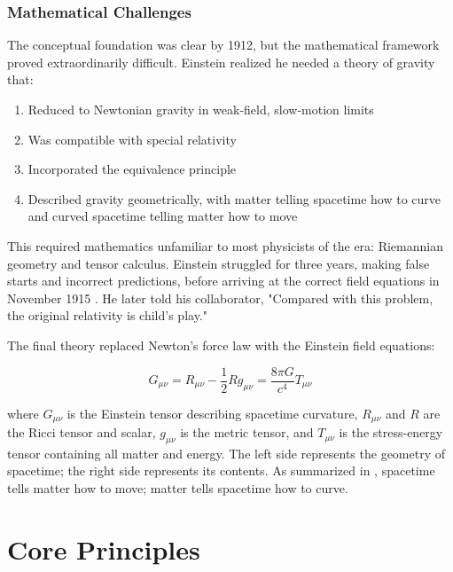 \documentclass[12pt, a4paper]{article}
\begin{document}
	\subsubsection{Mathematical Challenges}
	
	The conceptual foundation was clear by 1912, but the mathematical framework proved extraordinarily difficult. Einstein realized he needed a theory of gravity that:
	
	\begin{enumerate}
		\item Reduced to Newtonian gravity in weak-field, slow-motion limits
		\item Was compatible with special relativity
		\item Incorporated the equivalence principle
		\item Described gravity geometrically, with matter telling spacetime how to curve and curved spacetime telling matter how to move
	\end{enumerate}\textit{}
	
	This required mathematics unfamiliar to most physicists of the era: Riemannian geometry and tensor calculus. Einstein struggled for three years, making false starts and incorrect predictions, before arriving at the correct field equations in November 1915 \citep{carrollSpacetimeGeometryIntroduction2019}. He later told his collaborator, "Compared with this problem, the original relativity is child's play."
	
	The final theory replaced Newton's force law with the Einstein field equations:
	
	\begin{equation}
		G_{\mu\nu} = R_{\mu\nu} - \frac{1}{2}R g_{\mu\nu} = \frac{8\pi G}{c^4} T_{\mu\nu}
		\label{eq:efes}
	\end{equation}
	
	where \(G_{\mu\nu}\) is the Einstein tensor describing spacetime curvature, \(R_{\mu\nu}\) and \(R\) are the Ricci tensor and scalar, \(g_{\mu\nu}\) is the metric tensor, and \(T_{\mu\nu}\) is the stress-energy tensor containing all matter and energy. The left side represents the geometry of spacetime; the right side represents its contents. As summarized in \citet{carrollSpacetimeGeometryIntroduction2019}, spacetime tells matter how to move; matter tells spacetime how to curve.
	
	\section{Core Principles}
	
\end{document}
